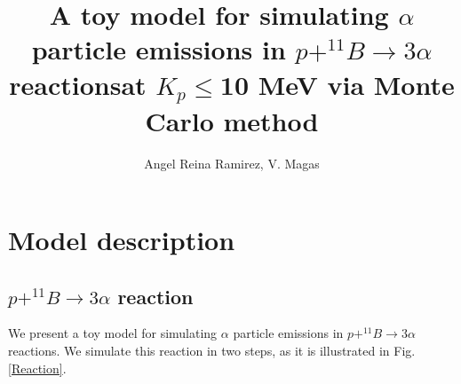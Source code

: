 \documentclass[aps,prc,twocolumn,floatfix,showpacs,a4paper,
nofootinbib,amsmath,amssymb]{revtex4}
\begin{document}
\title{A toy model for simulating $\alpha$ particle emissions in $p+ ^{11}B \rightarrow 3 \alpha$ reactions\linebreak at $K_p\le$10 MeV via Monte Carlo method}

\author{Angel Reina Ramirez, V. Magas}
\smallskip




\maketitle

\section{Model description}

\subsection{ $p+ ^{11}B \rightarrow 3 \alpha$ reaction}
We present a toy model for simulating $\alpha$ particle emissions in $p+ ^{11}B \rightarrow 3 \alpha$ reactions. We simulate this reaction in two steps, as it  is illustrated  in Fig. \ref{Reaction}.
\end{document}
